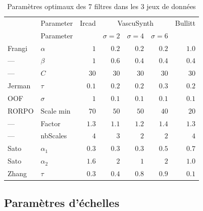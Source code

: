 \begin{table}[!ht]
 
  \begin{center}
  \caption{Paramètres optimaux des 7 filtres dans les 3 jeux de données}
      \begin{tabular}{llrrrrr}
                          \hline
             & Parameter  & Ircad       &  \multicolumn{3}{c}{VascuSynth}            &  Bullitt\\
             & Parameter  &         & $\sigma = 2$  & $\sigma = 4$ & $\sigma = 6$ &       \\
                         \hline
      Frangi &  $\alpha$  & $1$         & $0.2$     & $0.2$        & $0.2$           & $1.0$   \\
      ---    &  $\beta$   & $1$         & $0.6$     & $0.4$       & $0.4$           & $0.4$   \\
      ---    &  $C$       & $30$        & $30$       & $30$         & $30$            & $30$    \\
      Jerman & $\tau$     & $0.1$       & $0.2$     & $0.2$       & $0.3$          & $0.2$  \\
      OOF &  $\sigma$     & $1$         & $0.1$      & $0.1$        & $0.1$           & $0.1$   \\
      RORPO  & Scale min  & $70$        & $50$       & $50$         & $40$            & $20$    \\
      ---    &Factor      & $1.3$       & $1.1$     & $1.2$       & $1.4$          & $1.3$  \\
      ---    &  nbScales  & $4$         & $3$        & $2$          & $2$             & $4$     \\
      Sato   & $\alpha_1$ & $0.3$       & $0.3$      & $0.3$        & $0.5$          & $0.7$   \\
      Sato   & $\alpha_2$ & $1.6$       & $2$      & $1$        & $2$           & $1.0$   \\
      Zhang  & $\tau$     & $0.3$       & $0.4$     & $0.8$       & $0.9$          & $0.1$  \\
          \hline
      \end{tabular}
  \label{tab:optimal_parameters}
  \end{center}
\end{table}


\subsection{Paramètres d'échelles}

